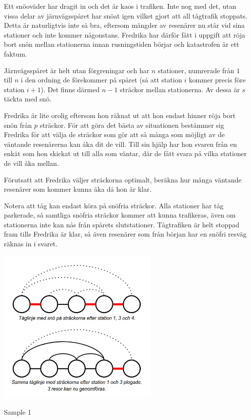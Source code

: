 Ett snöoväder har dragit in och det är kaos i trafiken.
Inte nog med det, utan vissa delar av järnvägsspåret har snöat igen vilket gjort att all tågtrafik stoppats.
Detta är naturligtvis inte så bra, eftersom mängder av resenärer nu står vid sina stationer och inte kommer någonstans.
Fredrika har därför fått i uppgift att röja bort snön mellan stationerna innan rusningstiden börjar och katastrofen är ett faktum.

Järnvägsspåret är helt utan förgreningar och har $n$ stationer, numrerade från $1$ till $n$ i den ordning de förekommer på spåret (så att station $i$ kommer precis före station $i+1$).
Det finns därmed $n - 1$ sträckor mellan stationerna.
Av dessa är $s$ täckta med snö.

Fredrika är lite orolig eftersom hon räknat ut att hon endast hinner röja bort snön från $p$ sträckor.
För att göra det bästa av situationen bestämmer sig Fredrika för att välja de sträckor som gör att så många som möjligt av de väntande resenärerna kan åka dit de vill.
Till sin hjälp har hon svaren från en enkät som hon skickat ut till alla som väntar, där de fått svara på vilka stationer de vill åka mellan.

Förutsatt att Fredrika väljer sträckorna optimalt, beräkna hur många väntande resenärer som kommer kunna åka då hon är klar.

Notera att tåg kan endast köra på snöfria sträckor. Alla stationer har tåg parkerade, så samtliga snöfria sträckor kommer att kunna trafikeras, även om stationerna inte kan nås från spårets slutstationer. Tågtrafiken är helt stoppad fram tills Fredrika är klar, så även resenärer som från början har en snöfri resväg räknas in i svaret.

\begin{center}
\includegraphics[width=8cm]{snokaos.png}
\caption{Sample 1}
\end{center} 

